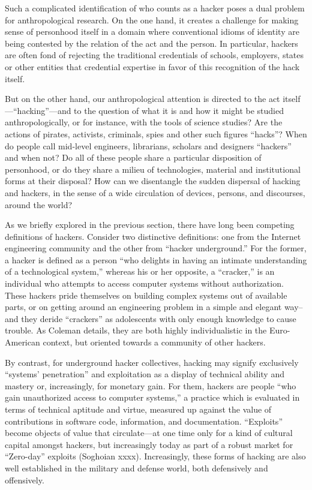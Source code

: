 \documentclass[10pt,letter,oneside]{scrartcl}
\begin{document}
Such a complicated identification of who counts as a hacker poses a dual
problem for anthropological research.  On the one hand, it creates a challenge
for making sense of personhood itself in a domain  where conventional idioms of
identity are being contested by the relation of the act and the person.  In
particular, hackers are often fond of rejecting the traditional credentials of
schools, employers, states or other entities that credential expertise in favor
of this recognition of the hack itself.  

But on the other hand, our anthropological attention is directed to the act
itself---``hacking''---and to the question of what it is and how it might be
studied anthropologically, or for instance, with the tools of science studies?
Are the actions of pirates, activists, criminals, spies and other such figures
``hacks''?  When do people call mid-level engineers, librarians, scholars and
designers ``hackers'' and when not?  Do all of these people share a particular
disposition of personhood, or do they share a milieu of technologies, material
and institutional forms at their disposal?  How can we disentangle the sudden
dispersal of hacking and hackers, in the sense of a wide circulation of devices,
persons, and discourses, around the world?

As we briefly explored in the previous section, there have long been competing
definitions of hackers.  Consider two distinctive definitions: one from the
Internet engineering community and the other from ``hacker underground.''  For
the former, a hacker is defined as a person ``who delights in having an intimate
understanding of a technological system,'' whereas his or her opposite, a
``cracker,'' is an individual who attempts to access computer systems without
authorization.  These hackers pride themselves on building complex systems out
of available parts, or on getting around an engineering problem in a simple and
elegant way--and they deride ``crackers'' as adolescents with only enough
knowledge to cause trouble.  As Coleman \cite*{coleman_coding_2012} details,
they are both highly individualistic in the Euro-American context, but oriented
towards a community of other hackers.

By contrast, for underground hacker collectives, hacking may signify
exclusively ``systems' penetration'' and exploitation as a display of technical
ability and mastery or, increasingly, for monetary gain.  For them, hackers are
people ``who gain unauthorized access to computer systems,'' a practice which
is evaluated in terms of technical aptitude and virtue, measured up against the
value of contributions in software code, information, and documentation.
``Exploits'' become objects of value that circulate---at one time only for a
kind of cultural capital amongst hackers, but increasingly today as part of a
robust market for ``Zero-day'' exploits (Soghoian xxxx).  Increasingly, these
forms of hacking are also well established in the military and defense world,
both defensively and offensively.
\end{document}
